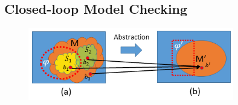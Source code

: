 \subsection{Closed-loop Model Checking}
%
%
\begin{figure}[!t]
		\centering
		\includegraphics[width=0.8\textwidth]{figs/distinction.png}
		\caption{\small }
		\label{fig:ambiguity}
\end{figure}
